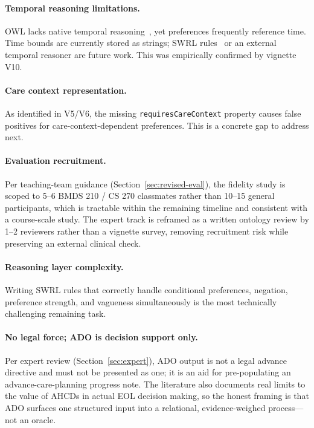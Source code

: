 \documentclass[11pt]{article}
\newcommand{\onto}[1]{\texttt{#1}}
\begin{document}
\paragraph{Temporal reasoning limitations.}
OWL lacks native temporal reasoning~\cite{owl2primer}, yet preferences frequently reference time. Time bounds are currently stored as strings; SWRL rules~\cite{swrl} or an external temporal reasoner are future work. This was empirically confirmed by vignette V10.

\paragraph{Care context representation.}
As identified in V5/V6, the missing \onto{requiresCareContext} property causes false positives for care-context-dependent preferences. This is a concrete gap to address next.

\paragraph{Evaluation recruitment.}
Per teaching-team guidance (Section~\ref{sec:revised-eval}), the fidelity study is scoped to 5--6 BMDS 210 / CS 270 classmates rather than 10--15 general participants, which is tractable within the remaining timeline and consistent with a course-scale study. The expert track is reframed as a written ontology review by 1--2 reviewers rather than a vignette survey, removing recruitment risk while preserving an external clinical check.

\paragraph{Reasoning layer complexity.}
Writing SWRL rules that correctly handle conditional preferences, negation, preference strength, and vagueness simultaneously is the most technically challenging remaining task.

\paragraph{No legal force; ADO is decision support only.}
Per expert review (Section~\ref{sec:expert}), ADO output is not a legal advance directive and must not be presented as one; it is an aid for pre-populating an advance-care-planning progress note. The literature also documents real limits to the value of AHCDs in actual EOL decision making, so the honest framing is that ADO surfaces one structured input into a relational, evidence-weighed process---not an oracle.
\end{document}
